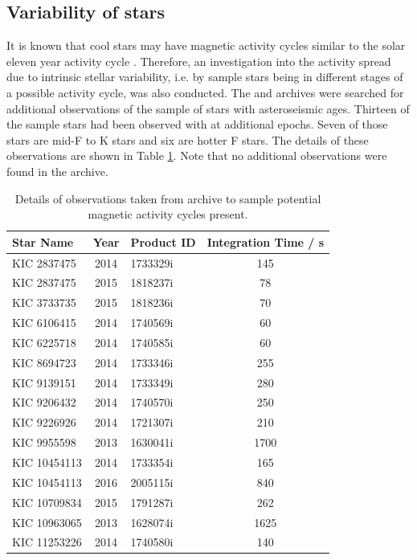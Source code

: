 \subsection{Variability of stars}
\label{Chp4_results_variability}
It is known that cool stars may have magnetic activity cycles similar to the solar eleven year activity cycle \citep{Wilson_1978,Baliunas_etal_1995}. Therefore, an investigation into the activity spread due to intrinsic stellar variability, i.e. by sample stars being in different stages of a possible activity cycle, was also conducted. The \esp and \narval archives were searched for additional observations of the sample of stars with asteroseismic ages. Thirteen of the sample stars had been observed with \esp at additional epochs. Seven of those stars are mid-F to K stars and six are hotter F stars. The details of these observations are shown in Table \ref{Table:esp_additional_obs_table}. Note that no additional observations were found in the \narval archive.

\begin{table}
\centering
\begin{tabular}{lclc}
\hline
Star Name    & Year & Product ID & Integration Time / s \\
\hline
KIC 2837475  & 2014 & 1733329i   & 145                  \\
KIC 2837475  & 2015 & 1818237i   & 78                   \\
KIC 3733735  & 2015 & 1818236i   & 70                   \\
KIC 6106415  & 2014 & 1740569i   & 60                   \\
KIC 6225718  & 2014 & 1740585i   & 60                   \\
KIC 8694723  & 2014 & 1733346i   & 255                  \\
KIC 9139151  & 2014 & 1733349i   & 280                  \\
KIC 9206432  & 2014 & 1740570i   & 250                  \\
KIC 9226926  & 2014 & 1721307i   & 210                  \\
KIC 9955598  & 2013 & 1630041i   & 1700                 \\
KIC 10454113 & 2014 & 1733354i   & 165                  \\
KIC 10454113 & 2016 & 2005115i   & 840                  \\
KIC 10709834 & 2015 & 1791287i   & 262                  \\
KIC 10963065 & 2013 & 1628074i   & 1625                 \\
KIC 11253226 & 2014 & 1740580i   & 140					\\
\hline
\end{tabular}
\caption[Details of archival \esp observations]{Details of observations taken from \esp archive to sample potential magnetic activity cycles present.}
\label{Table:esp_additional_obs_table}
\end{table}

